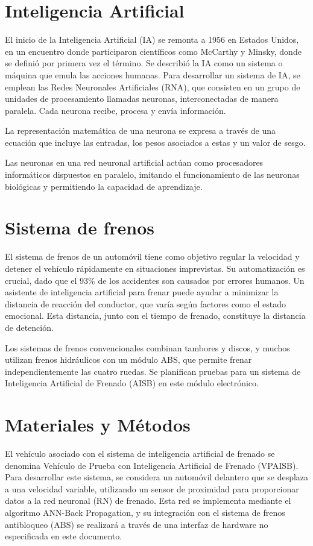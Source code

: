 \documentclass[9pt,twocolumn,twoside]{article} %
\begin{document}
\section{Inteligencia Artificial}
El inicio de la Inteligencia Artificial (IA) se remonta a 1956 en Estados Unidos, en un encuentro donde participaron científicos como McCarthy y Minsky, donde se definió por primera vez el término. Se describió la IA como un sistema o máquina que emula las acciones humanas. Para desarrollar un sistema de IA, se emplean las Redes Neuronales Artificiales (RNA), que consisten en un grupo de unidades de procesamiento llamadas neuronas, interconectadas de manera paralela. Cada neurona recibe, procesa y envía información.

La representación matemática de una neurona se expresa a través de una ecuación que incluye las entradas, los pesos asociados a estas y un valor de sesgo.

\begin{center}
\end{center}

Las neuronas en una red neuronal artificial actúan como procesadores informáticos dispuestos en paralelo, imitando el funcionamiento de las neuronas biológicas y permitiendo la capacidad de aprendizaje.

\section{Sistema de frenos}
El sistema de frenos de un automóvil tiene como objetivo regular la velocidad y detener el vehículo rápidamente en situaciones imprevistas. Su automatización es crucial, dado que el 93\% de los accidentes son causados por errores humanos. Un asistente de inteligencia artificial para frenar puede ayudar a minimizar la distancia de reacción del conductor, que varía según factores como el estado emocional. Esta distancia, junto con el tiempo de frenado, constituye la distancia de detención.

Los sistemas de frenos convencionales combinan tambores y discos, y muchos utilizan frenos hidráulicos con un módulo ABS, que permite frenar independientemente las cuatro ruedas. Se planifican pruebas para un sistema de Inteligencia Artificial de Frenado (AISB) en este módulo electrónico.

\section{Materiales y Métodos}
El vehículo asociado con el sistema de inteligencia artificial de frenado se denomina Vehículo de Prueba con Inteligencia Artificial de Frenado (VPAISB). Para desarrollar este sistema, se considera un automóvil delantero que se desplaza a una velocidad variable, utilizando un sensor de proximidad para proporcionar datos a la red neuronal (RN) de frenado. Esta red se implementa mediante el algoritmo ANN-Back Propagation, y su integración con el sistema de frenos antibloqueo (ABS) se realizará a través de una interfaz de hardware no especificada en este documento.
\end{document}
